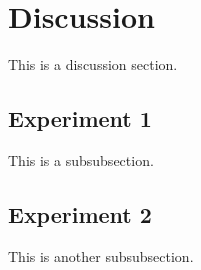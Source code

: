 \clearpage
\section{Discussion}
This is a discussion section.

\subsection{Experiment 1}
This is a subsubsection.

\subsection{Experiment 2}
This is another subsubsection.

